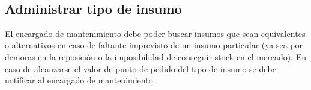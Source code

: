 \documentclass[a4paper, 12pt,twoside]{report}  %
\numberwithin{equation}{subsection} %
\begin{document}
\indent
\\\\\\\\\\\\\\\\\\\\\\
\pagebreak

\subsection*{Administrar tipo de insumo}
El encargado de mantenimiento debe poder buscar insumos que sean equivalentes o alternativos en caso de faltante imprevisto de un insumo particular (ya sea por demoras en la reposición o la imposibilidad de conseguir stock en el mercado). En caso de alcanzarse el valor de punto de pedido del tipo de insumo se debe notificar al encargado de mantenimiento.

\renewcommand{\arraystretch}{1.4}
\end{document}
